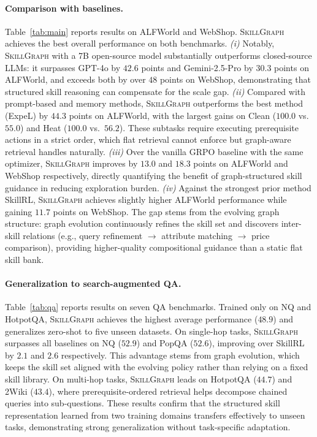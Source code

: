 \paragraph{Comparison with baselines.}
Table~\ref{tab:main} reports results on ALFWorld and WebShop. \textsc{SkillGraph} achieves the best overall performance on both benchmarks.
\textit{(i)} Notably, \textsc{SkillGraph} with a 7B open-source model substantially outperforms closed-source LLMs: it surpasses GPT-4o by $42.6$ points and Gemini-2.5-Pro by $30.3$ points on ALFWorld, and exceeds both by over $48$ points on WebShop, demonstrating that structured skill reasoning can compensate for the scale gap.
\textit{(ii)} Compared with prompt-based and memory methods, \textsc{SkillGraph} outperforms the best method (ExpeL) by $44.3$ points on ALFWorld, with the largest gains on Clean ($100.0$ vs.\ $55.0$) and Heat ($100.0$ vs.\ $56.2$). These subtasks require executing prerequisite actions in a strict order, which flat retrieval cannot enforce but graph-aware retrieval handles naturally.
\textit{(iii)} Over the vanilla GRPO baseline with the same optimizer, \textsc{SkillGraph} improves by $13.0$ and $18.3$ points on ALFWorld and WebShop respectively, directly quantifying the benefit of graph-structured skill guidance in reducing exploration burden.
\textit{(iv)} Against the strongest prior method SkillRL, \textsc{SkillGraph} achieves slightly higher ALFWorld performance while gaining $11.7$ points on WebShop. The gap stems from the evolving graph structure: graph evolution continuously refines the skill set and discovers inter-skill relations (e.g., query refinement $\to$ attribute matching $\to$ price comparison), providing higher-quality compositional guidance than a static flat skill bank.

\paragraph{Generalization to search-augmented QA.}

Table~\ref{tab:qa} reports results on seven QA benchmarks. Trained only on NQ and HotpotQA, \textsc{SkillGraph} achieves the highest average performance ($48.9$) and generalizes zero-shot to five unseen datasets.
On single-hop tasks, \textsc{SkillGraph} surpasses all baselines on NQ ($52.9$) and PopQA ($52.6$), improving over SkillRL by $2.1$ and $2.6$ respectively. This advantage stems from graph evolution, which keeps the skill set aligned with the evolving policy rather than relying on a fixed skill library.
On multi-hop tasks, \textsc{SkillGraph} leads on HotpotQA ($44.7$) and 2Wiki ($43.4$), where prerequisite-ordered retrieval helps decompose chained queries into sub-questions.
These results confirm that the structured skill representation learned from two training domains transfers effectively to unseen tasks, demonstrating strong generalization without task-specific adaptation.

